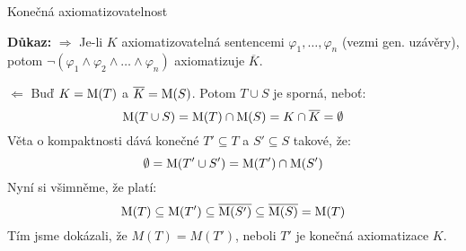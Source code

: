 \documentclass{beamer}
\begin{document}
\begin{frame}{Konečná axiomatizovatelnost}
    
    \smallskip


    \textbf{Důkaz:} \alert{\Large$\Rightarrow$}
    Je-li $K$ axiomatizovatelná \alert{sentencemi} $\varphi_1,\dots,\varphi_n$ (vezmi gen. uzávěry), potom $\neg(\varphi_1\land\varphi_2\land\dots\land\varphi_n)$ axiomatizuje $\overline{K}$.

    \alert{\Large$\Leftarrow$} Buď $K=\operatorname{M}(T)$ a $\overline{K}=\operatorname{M}(S)$. Potom  \alert{$T\cup S$ je sporná}, neboť:
    $$
    \operatorname{M}(T\cup S)=\operatorname{M}(T)\cap \operatorname{M}(S)=K\cap\overline{K}=\emptyset
    $$
    \alert{Věta o kompaktnosti} dává konečné $T'\subseteq T$ a $S'\subseteq S$ takové, že:
    $$
    \emptyset = \operatorname{M}(T'\cup S')=\operatorname{M}(T')\cap \operatorname{M}(S')
    $$
    Nyní si všimněme, že platí:
    $$
    \operatorname{M}(T)\subseteq \operatorname{M}(T')\subseteq \overline{\operatorname{M}(S')}\subseteq \overline{\operatorname{M}(S)}=\operatorname{M}(T)
    $$
    Tím jsme dokázali, že \alert{$M(T)=M(T')$}, neboli $T'$ je konečná axiomatizace $K$. \hfill\qedsymbol

\end{frame}
\end{document}
